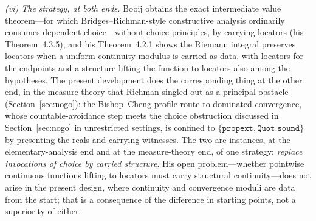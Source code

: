 \documentclass[11pt]{article}
\theoremstyle{definition}
\theoremstyle{remark}
\begin{document}
\emph{(vi) The strategy, at both ends.}  Booij obtains the exact intermediate value theorem---for which Bridges--Richman-style constructive analysis ordinarily consumes dependent choice---without choice principles, by carrying locators (his Theorem~4.3.5); and his Theorem~4.2.1 shows the Riemann integral preserves locators when a uniform-continuity modulus is carried as data, with locators for the endpoints and a structure lifting the function to locators also among the hypotheses.  The present development does the corresponding thing at the other end, in the measure theory that Richman singled out as a principal obstacle (Section~\ref{sec:nogo}): the Bishop--Cheng profile route to dominated convergence, whose countable-avoidance step meets the choice obstruction discussed in Section~\ref{sec:nogo} in unrestricted settings, is confined to $\{\texttt{propext},\texttt{Quot.sound}\}$ by presenting the reals and carrying witnesses.  The two are instances, at the elementary-analysis end and at the measure-theory end, of one strategy: \emph{replace invocations of choice by carried structure}.  His open problem---whether pointwise continuous functions lifting to locators must carry structural continuity---does not arise in the present design, where continuity and convergence moduli are data from the start; that is a consequence of the difference in starting points, not a superiority of either.
\end{document}

